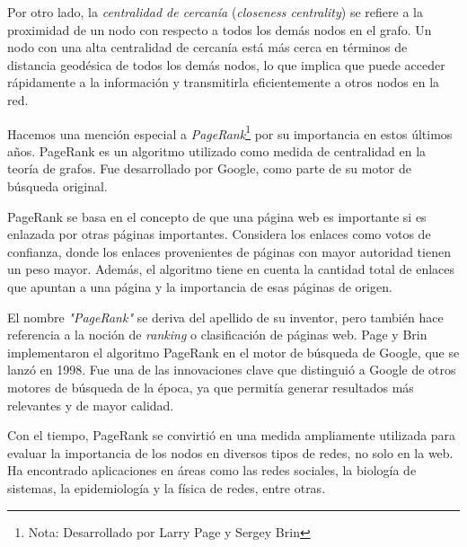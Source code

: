 Por otro lado, la \textit{centralidad de cercanía} (\textit{closeness centrality}) se refiere a la 
proximidad de un nodo con respecto a todos los demás nodos en el grafo. Un nodo con una alta 
centralidad de cercanía está más cerca en términos de distancia geodésica de todos los demás nodos, 
lo que implica que puede acceder rápidamente a la información y transmitirla eficientemente a otros 
nodos en la red.

Hacemos una mención especial a \textit{PageRank}\footnote{Nota: Desarrollado por Larry Page y Sergey 
Brin} por su importancia en estos últimos años. PageRank es un algoritmo utilizado como medida de 
centralidad en la teoría de grafos. Fue desarrollado por Google, como parte de su motor de búsqueda 
original.

PageRank se basa en el concepto de que una página web es importante si es enlazada por otras 
páginas importantes. Considera los enlaces como votos de confianza, donde los enlaces provenientes 
de páginas con mayor autoridad tienen un peso mayor. Además, el algoritmo tiene en cuenta la 
cantidad total de enlaces que apuntan a una página y la importancia de esas páginas de origen.

El nombre \textit{"PageRank"} se deriva del apellido de su inventor, pero también hace referencia 
a la noción de \textit{ranking} o clasificación de páginas web. Page y Brin implementaron el 
algoritmo PageRank en el motor de búsqueda de Google, que se lanzó en 1998. Fue una de 
las innovaciones clave que distinguió a Google de otros motores de búsqueda de la época, ya que 
permitía generar resultados más relevantes y de mayor calidad.

Con el tiempo, PageRank se convirtió en una medida ampliamente utilizada para evaluar la importancia 
de los nodos en diversos tipos de redes, no solo en la web. Ha encontrado aplicaciones en áreas como 
las redes sociales, la biología de sistemas, la epidemiología y la física de redes, entre otras.

